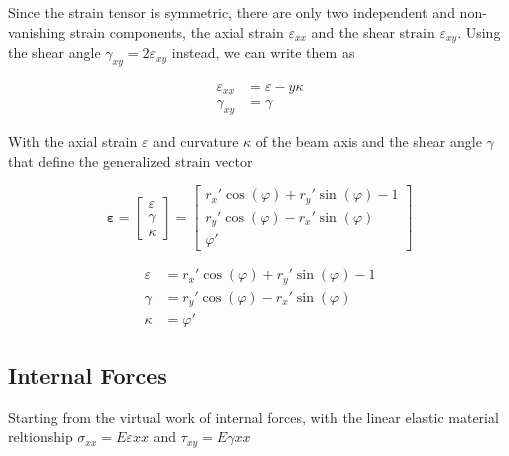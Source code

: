 Since the strain tensor is symmetric, there are only two independent and non-vanishing strain components, the axial strain $\varepsilon_{xx}$ and the shear strain $\varepsilon_{xy}$.
Using the shear angle $\gamma_{xy} = 2\varepsilon_{xy}$ instead, we can write them as

\begin{align}
\varepsilon_{xx} &= \varepsilon - y\kappa \\
\gamma_{xy} &= \gamma
\end{align}

With the axial strain $\varepsilon$ and curvature $\kappa$ of the beam axis and the shear angle $\gamma$ that define the generalized strain vector

\begin{equation}
\boldsymbol{\varepsilon}
=
\begin{bmatrix}
\varepsilon \\ \gamma \\ \kappa
\end{bmatrix}
=
\begin{bmatrix}
r_x'\cos(\varphi) + r_y'\sin(\varphi) - 1 \\
r_y'\cos(\varphi) - r_x'\sin(\varphi) \\
\varphi'
\end{bmatrix}
\end{equation}

\begin{align}
\varepsilon &= r_x'\cos(\varphi) + r_y'\sin(\varphi) - 1 \\
\gamma &= r_y'\cos(\varphi) - r_x'\sin(\varphi) \\
\kappa &= \varphi'
\end{align}

\subsection*{Internal Forces}

Starting from the virtual work of internal forces, with the linear elastic material reltionship $\sigma_{xx} = E\varepsilon{xx}$ and $\tau_{xy} = E\gamma{xx}$


